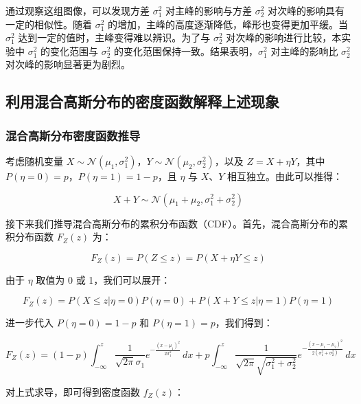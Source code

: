 \documentclass{article}
\begin{document}
通过观察这组图像，可以发现方差 $\sigma_1^2$ 对主峰的影响与方差 $\sigma_2^2$ 对次峰的影响具有一定的相似性。随着 $\sigma_1^2$ 的增加，主峰的高度逐渐降低，峰形也变得更加平缓。当 $\sigma_1^2$ 达到一定的值时，主峰变得难以辨识。为了与 $\sigma_2^2$ 对次峰的影响进行比较，本实验中 $\sigma_1^2$ 的变化范围与 $\sigma_2^2$ 的变化范围保持一致。结果表明，$\sigma_1^2$ 对主峰的影响比 $\sigma_2^2$ 对次峰的影响显著更为剧烈。\label{sec:sigma1}

\subsection{利用混合高斯分布的密度函数解释上述现象}

\subsubsection{混合高斯分布密度函数推导}

考虑随机变量 \( X \sim \mathcal{N}(\mu_1, \sigma_1^2) \)，\( Y \sim \mathcal{N}(\mu_2, \sigma_2^2) \)，以及 \( Z = X + \eta Y \)，其中 \( P(\eta = 0) = p \)，\( P(\eta = 1) = 1 - p \)，且 \( \eta \) 与 \( X \)、\( Y \) 相互独立。由此可以推得：

\[
X + Y \sim \mathcal{N}(\mu_1 + \mu_2, \sigma_1^2 + \sigma_2^2)
\]

接下来我们推导混合高斯分布的累积分布函数（CDF）。首先，混合高斯分布的累积分布函数 \( F_Z(z) \) 为：

\begin{equation}
F_Z(z) = P(Z \leq z) = P(X + \eta Y \leq z)
\end{equation}

由于 \( \eta \) 取值为 0 或 1，我们可以展开：

\begin{equation}
F_Z(z) = P(X \leq z | \eta = 0) P(\eta = 0) + P(X + Y \leq z | \eta = 1) P(\eta = 1)
\end{equation}

进一步代入 \( P(\eta = 0) = 1 - p \) 和 \( P(\eta = 1) = p \)，我们得到：

\begin{equation}
F_Z(z) = (1 - p) \int_{-\infty}^z \frac{1}{\sqrt{2\pi} \sigma_1} e^{-\frac{(x - \mu_1)^2}{2 \sigma_1^2}} \, dx + p \int_{-\infty}^z \frac{1}{\sqrt{2\pi} \sqrt{\sigma_1^2 + \sigma_2^2}} e^{-\frac{(x - \mu_1 - \mu_2)^2}{2(\sigma_1^2 + \sigma_2^2)}} \, dx
\label{eq1}
\end{equation}

对上式求导，即可得到密度函数 \( f_Z(z) \)：
\end{document}
